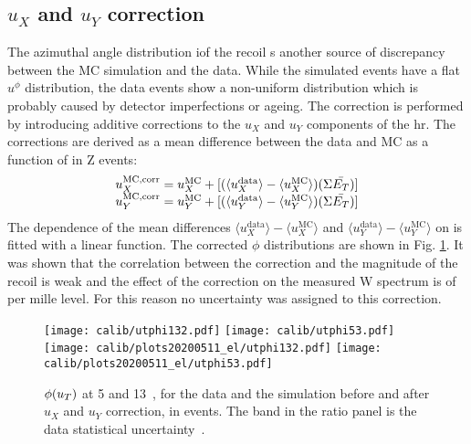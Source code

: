      \subsection{$u_X$ and $u_Y$ correction}
     The azimuthal angle distribution iof the recoil s another source of discrepancy between the MC simulation and the data. While the simulated events have a flat $u^{\phi}$ distribution, the data events show a non-uniform distribution which is probably caused by detector imperfections or ageing. The correction is performed by introducing additive corrections to the $u_X$ and $u_Y$ components of the \gls{hr}. The corrections are derived as a mean difference between the data and MC as a function of \setue in Z events:
     \begin{equation}
     \begin{array}{c}
     u_X^{\mathrm{MC, corr}} = u_X^{\mathrm{MC}} + [(\langle{u_X^{\mathrm{data}}}\rangle-\langle{u_X^{\mathrm{MC}}}\rangle)(\Sigma \bar{E_T} )] \\
     u_Y^{\mathrm{MC, corr}} = u_Y^{\mathrm{MC}} + [(\langle{u_Y^{\mathrm{data}}}\rangle-\langle{u_Y^{\mathrm{MC}}}\rangle)(\Sigma \bar{E_T} )]
     \end{array}
     \end{equation}
     The dependence of the mean differences $\langle{u_X^{\mathrm{data}}}\rangle-\langle{u_X^{\mathrm{MC}}}\rangle$ and $\langle{u_Y^{\mathrm{data}}}\rangle-\langle{u_Y^{\mathrm{MC}}}\rangle$ on \setue is fitted with a linear function. The corrected $\phi$ distributions are shown in Fig. \ref{fig:utphicorr}. It was shown that the correlation between the correction and the magnitude of the recoil is weak and the effect of the correction on the measured W spectrum is of per mille level. For this reason no uncertainty was assigned to this correction.
     
     \begin{figure}
     		\texttt{[image: calib/utphi132.pdf]}
     		\texttt{[image: calib/utphi53.pdf]}
     		\texttt{[image: calib/plots20200511\_el/utphi132.pdf]}
     		\texttt{[image: calib/plots20200511\_el/utphi53.pdf]}
     	\caption{$\phi(u_{T})$ at 5 and 13~\TeV, for the data and the simulation before and after $u_X$ and $u_Y$ correction, in \Zboson events. The band in the ratio panel is the data statistical uncertainty~\cite{int_note_hr}.}
     	\label{fig:utphicorr}
     \end{figure}
     
